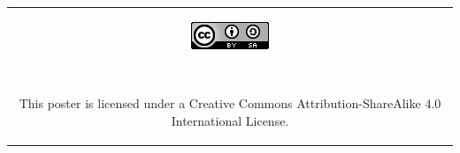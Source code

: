 \documentclass[25pt, margin=0mm, innermargin=15mm, blockverticalspace=15mm, colspace=15mm, subcolspace=8mm]{tikzposter}
\begin{document}
\begin{columns}
{\begin{center}
\begin{tabular}{c}
\begin{minipage}{0.1\linewidth}
\href{http://creativecommons.org/licenses/by-sa/4.0/}{\includegraphics[width=\textwidth]{ccbysa}}
\end{minipage}
~
\begin{minipage}{0.35\linewidth}
\small This poster is licensed under a Creative Commons Attribution-ShareAlike 4.0 International License.
\end{minipage}

\end{tabular}
\end{center}

\vspace{-0.08cm}
}

\end{columns}
\end{document}

